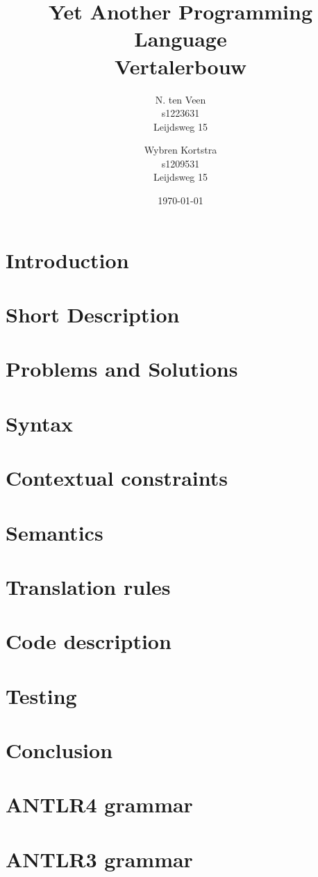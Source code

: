 \documentclass[a4paper]{report}
\title{
	Yet Another Programming Language \\
	{\large Vertalerbouw }
}
\author{
	N. ten Veen \\
    s1223631 \\
    Leijdsweg 15
	\and
    Wybren Kortstra \\
    s1209531 \\
    Leijdsweg 15
}
\date{\today}
\begin{document}
\maketitle

\tableofcontents \pagebreak

\chapter{Introduction}



\chapter{Short Description}


\chapter{Problems and Solutions}


\chapter{Syntax}



\chapter{Contextual constraints}


\chapter{Semantics}

\chapter{Translation rules}

\chapter{Code description}

\chapter{Testing}

\chapter{Conclusion}


\begin{appendices}
\chapter{ANTLR4 grammar}
\label{app:antlr4}

\chapter{ANTLR3 grammar}
\label{app:antlr3}
\lstset{mathescape=false}



\end{appendices}
\end{document}
